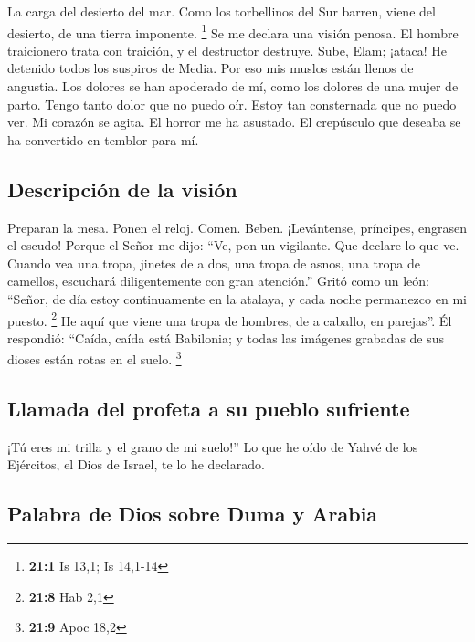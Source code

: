 \begin{paracol}{2}
 La carga del desierto del mar. Como los torbellinos del
Sur barren, viene del desierto, de una tierra imponente. \footnote{\textbf{21:1}
  Is 13,1; Is 14,1-14}  Se me declara una visión penosa.
El hombre traicionero trata con traición, y el destructor destruye.
Sube, Elam; ¡ataca! He detenido todos los suspiros de Media.
 Por eso mis muslos están llenos de angustia. Los dolores
se han apoderado de mí, como los dolores de una mujer de parto. Tengo
tanto dolor que no puedo oír. Estoy tan consternada que no puedo ver.
 Mi corazón se agita. El horror me ha asustado. El
crepúsculo que deseaba se ha convertido en temblor para mí.

\hypertarget{descripciuxf3n-de-la-visiuxf3n}{%
\subsection{Descripción de la
visión}\label{descripciuxf3n-de-la-visiuxf3n}}

 Preparan la mesa. Ponen el reloj. Comen. Beben.
¡Levántense, príncipes, engrasen el escudo!  Porque el
Señor me dijo: ``Ve, pon un vigilante. Que declare lo que ve.
 Cuando vea una tropa, jinetes de a dos, una tropa de
asnos, una tropa de camellos, escuchará diligentemente con gran
atención.''  Gritó como un león: ``Señor, de día estoy
continuamente en la atalaya, y cada noche permanezco en mi puesto.
\footnote{\textbf{21:8} Hab 2,1}  He aquí que viene una
tropa de hombres, de a caballo, en parejas''. Él respondió: ``Caída,
caída está Babilonia; y todas las imágenes grabadas de sus dioses están
rotas en el suelo. \footnote{\textbf{21:9} Apoc 18,2}

\hypertarget{llamada-del-profeta-a-su-pueblo-sufriente}{%
\subsection{Llamada del profeta a su pueblo
sufriente}\label{llamada-del-profeta-a-su-pueblo-sufriente}}

 ¡Tú eres mi trilla y el grano de mi suelo!'' Lo que he
oído de Yahvé de los Ejércitos, el Dios de Israel, te lo he declarado.

\hypertarget{palabra-de-dios-sobre-duma-y-arabia}{%
\subsection{Palabra de Dios sobre Duma y
Arabia}\label{palabra-de-dios-sobre-duma-y-arabia}}


\end{paracol}
